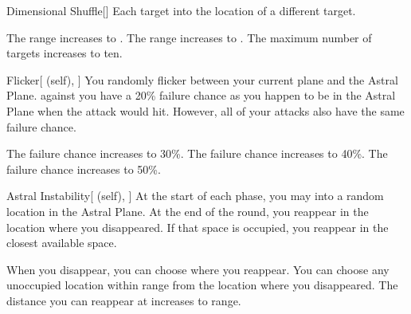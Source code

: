 \lowercase{\hypertarget{spell:Dimensional Shuffle}{}}\label{spell:Dimensional Shuffle}
\begin{freeability}[Rank 2]{\hypertarget{spell:Dimensional Shuffle}{Dimensional Shuffle}}[]
Each target  into the location of a different target.

\rankline
{} The range increases to \rnglong.
 The range increases to \rngext.
 The maximum number of targets increases to ten.

\end{freeability}
\vspace{0.25em}



\lowercase{\hypertarget{spell:Flicker}{}}\label{spell:Flicker}
\begin{attuneability}[Rank 2]{\hypertarget{spell:Flicker}{Flicker}}[ (self), ]
You randomly flicker between your current plane and the Astral Plane.
  against you have a 20\% failure chance as you happen to be in the Astral Plane when the attack would hit.
However, all of your attacks also have the same failure chance.

\rankline
{} The failure chance increases to 30\%.
 The failure chance increases to 40\%.
 The failure chance increases to 50\%.

\end{attuneability}
\vspace{0.25em}



\lowercase{\hypertarget{spell:Astral Instability}{}}\label{spell:Astral Instability}
\begin{attuneability}[Rank 3]{\hypertarget{spell:Astral Instability}{Astral Instability}}[ (self), ]
At the start of each phase, you may  into a random location in the Astral Plane.
At the end of the round, you reappear in the location where you disappeared.
If that space is occupied, you reappear in the closest available space.

\rankline
{} When you disappear, you can choose where you reappear.
You can choose any unoccupied location within \rngclose range from the location where you disappeared.
 The distance you can reappear at increases to \rngmed range.

\end{attuneability}
\vspace{0.25em}



